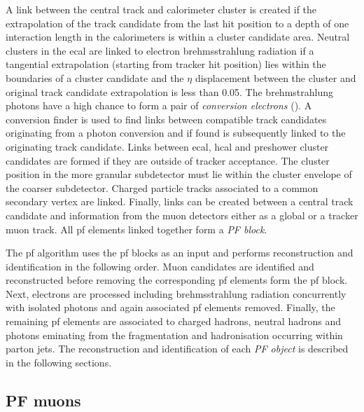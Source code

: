 A link between the central track and calorimeter cluster is created if the extrapolation of the track candidate from the last hit position to a depth of one interaction length in the calorimeters is within a cluster candidate area. 
Neutral clusters in the \acrshort{ecal} are linked to electron brehmsstrahlung radiation if a tangential extrapolation (starting from tracker hit position) lies within the boundaries of a cluster candidate and the $\eta$ displacement between the cluster and original track candidate extrapolation is less than 0.05.
The brehmstrahlung photons have a high chance to form a pair of \textit{conversion electrons} (\electronp{}\electronm{}).
A conversion finder 
is used to find links between compatible track candidates originating from a photon conversion and if found is subsequently linked to the originating track candidate.
Links between \acrshort{ecal}, \acrshort{hcal} and preshower cluster candidates are formed if they are outside of tracker acceptance.
The cluster position in the more granular subdetector must lie within the cluster envelope of the coarser subdetector.
Charged particle tracks associated to a common secondary vertex are linked.
Finally, links can be created between a central track candidate and information from the muon detectors either as a global or a tracker muon track. 
All \acrshort{pf} elements linked together form a \textit{PF block}.

The \acrshort{pf} algorithm uses the \acrshort{pf} blocks as an input and performs reconstruction and identification in the following order.
Muon candidates are identified and reconstructed before removing the corresponding \acrshort{pf} elements form the \acrshort{pf} block.
Next, electrons are processed including brehmsstrahlung radiation concurrently with isolated photons and again associated \acrshort{pf} elements removed.
Finally, the remaining \acrshort{pf} elements are associated to charged hadrons, neutral hadrons and photons eminating from the fragmentation and hadronisation occurring within parton jets.
The reconstruction and identification of each \textit{PF object} is described in the following sections.


\subsection{PF muons} %
\label{sub:pf_muons}

